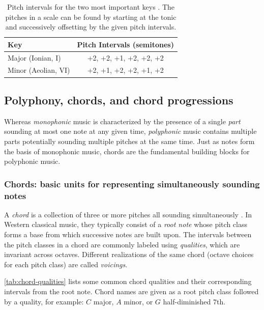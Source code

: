 \begin{table}[tb]
    \centering
    \begin{tabular}{lc}
        \toprule
        Key & Pitch Intervals (semitones) \\
        \midrule
        Major (Ionian, I) & +2, +2, +1, +2, +2, +2 \\
        Minor (Aeolian, VI) & +2, +1, +2, +2, +1, +2 \\
        \bottomrule
    \end{tabular}
    \caption{Pitch intervals for the two most important keys \citep{freedman2015correlational}. The pitches in a scale can be found by starting at the tonic and successively offsetting by the given pitch intervals.}
    \label{tab:key-intervals}
\end{table}

\subsection{Polyphony, chords, and chord progressions}

Whereas \emph{monophonic} music is characterized by the presence of a single
\emph{part} sounding at most one note at any given time, \emph{polyphonic}
music contains multiple parts potentially sounding multiple pitches at the same
time. Just as notes form the basis of monophonic music, chords are the fundamental
building blocks for polyphonic music.

\subsubsection{Chords: basic units for representing simultaneously sounding notes}

A \emph{chord} is a collection of three or more pitches all sounding
simultaneously \citep{randel1999harvard}. In Western classical music, they
typically consist of a \emph{root note} whose pitch class forms a base from
which successive notes are built upon. The intervals between the pitch classes
in a chord are commonly labeled using \emph{qualities}, which are invariant
across octaves. Different realizations of the same chord (\eg octave choices
for each pitch class) are called \emph{voicings}.

\cref{tab:chord-qualities} lists some common chord qualities and their
corresponding intervals from the root note. Chord names are given as a root
pitch class followed by a quality, for example: $C$ major, $A$ minor, or $G$
half-diminished $7$th.

